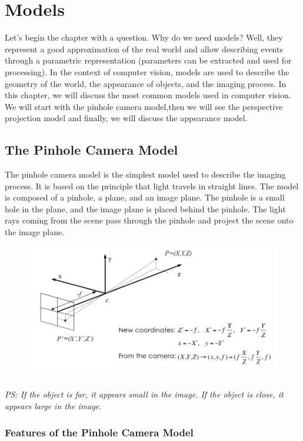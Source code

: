 \chapter{Models}
Let's begin the chapter with a question. Why do we need models?
Well, they represent a good approximation of the real world and allow describing events through a parametric representation (parameters can be extracted and used for processing). In the context of computer vision, models are used to describe the geometry of the world, the appearance of objects, and the imaging process. In this chapter, we will discuss the most common models used in computer vision. We will start with the pinhole camera model,then we will see the perspective projection model and finally, we will discuss the appearance model.
\section{The Pinhole Camera Model}
The pinhole camera model is the simplest model used to describe the imaging process. It is based on the principle that light travels in straight lines. The model is composed of a pinhole, a plane, and an image plane. The pinhole is a small hole in the plane, and the image plane is placed behind the pinhole. The light rays coming from the scene pass through the pinhole and project the scene onto the image plane. 
\begin{figure}[h]
    \centering
    \includegraphics[width=1\textwidth]{Figures/Pinhole.png}
\end{figure}
\\\textit{PS: If the object is far, it appears small in the image. If the object is close, it appears large in the image.}
\subsection{Features of the Pinhole Camera Model}

